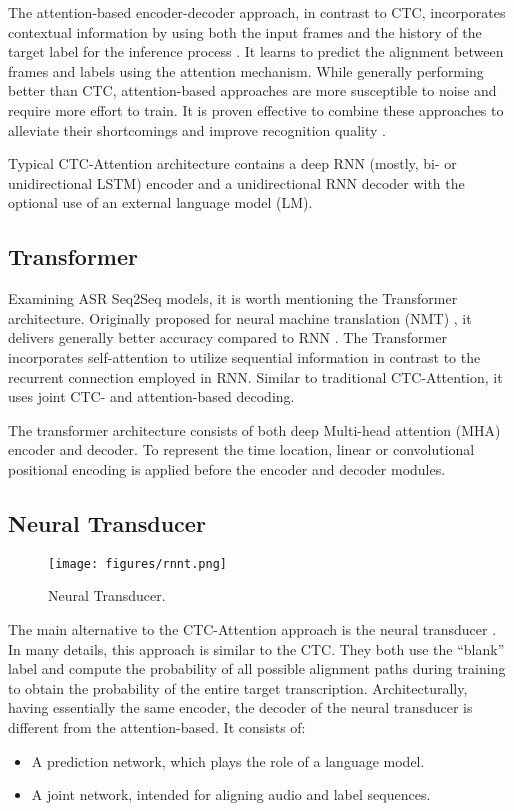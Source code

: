 \documentclass[a4paper]{article}
\begin{document}
The attention-based encoder-decoder approach, in contrast to CTC, incorporates contextual information by using both the input frames and the history of the target label for the inference process \cite{chan2015listen}. It learns to predict the alignment between frames and labels using the attention mechanism. While generally performing better than CTC, attention-based approaches are more susceptible to noise and require more effort to train. It is proven effective to combine these approaches to alleviate their shortcomings and improve recognition quality \cite{kim_joint_2017}.

Typical CTC-Attention architecture contains a deep RNN (mostly, bi- or unidirectional LSTM) encoder and a unidirectional RNN decoder with the optional use of an external language model (LM).

\subsection{Transformer}

Examining ASR Seq2Seq models, it is worth mentioning the Transformer architecture. Originally proposed for neural machine translation (NMT) \cite{attention_2017}, it delivers generally better accuracy compared to RNN \cite{karita_comparative_2019}. The Transformer incorporates self-attention to utilize sequential information in contrast to the recurrent connection employed in RNN. Similar to traditional CTC-Attention, it uses joint CTC- and attention-based decoding.

The transformer architecture consists of both deep Multi-head attention (MHA) encoder and decoder. To represent the time location, linear or convolutional positional encoding is applied before the encoder and decoder modules.

\subsection{Neural Transducer}

\begin{figure}[ht]
  \centering
  \texttt{[image: figures/rnnt.png]}
  \caption{Neural Transducer.}
  \label{fig:rnnt}
\end{figure}

The main alternative to the CTC-Attention approach is the neural transducer \cite{Graves_transducer}. In many details, this approach is similar to the CTC. They both use the ``blank'' label and compute the probability of all possible alignment paths during training to obtain the probability of the entire target transcription. Architecturally, having essentially the same encoder, the decoder of the neural transducer is different from the attention-based. It consists of:
\begin{itemize}
    \item A prediction network, which plays the role of a language model.
    \item A joint network, intended for aligning audio and label sequences.
\end{itemize}
\end{document}
